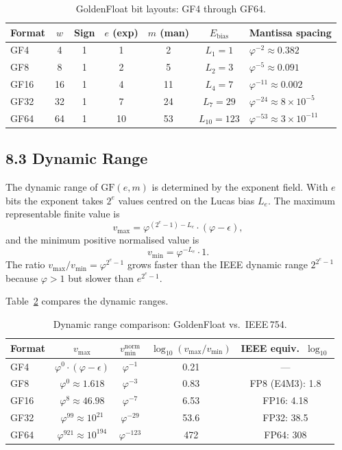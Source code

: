 \begin{table}[h]
\centering
\caption{GoldenFloat bit layouts: GF4 through GF64.}
\label{fa_04:tab:bit-layouts}
\begin{tabular}{@{}lcccccl@{}}
\toprule
Format & \(w\) & Sign & \(e\) (exp) & \(m\) (man) & \(E_{\text{bias}}\) & Mantissa spacing \\
\midrule
GF4  & 4  & 1 & 1 & 2 & \(L_1 = 1\)    & \(\varphi^{-2} \approx 0.382\) \\
GF8  & 8  & 1 & 2 & 5 & \(L_2 = 3\)    & \(\varphi^{-5} \approx 0.091\) \\
GF16 & 16 & 1 & 4 & 11 & \(L_4 = 7\)   & \(\varphi^{-11} \approx 0.002\) \\
GF32 & 32 & 1 & 7 & 24 & \(L_7 = 29\)  & \(\varphi^{-24} \approx 8 \times 10^{-5}\) \\
GF64 & 64 & 1 & 10 & 53 & \(L_{10} = 123\) & \(\varphi^{-53} \approx 3 \times 10^{-11}\) \\
\bottomrule
\end{tabular}
\end{table}

\subsection{8.3 Dynamic Range}\label{fa_04:gf-dynamic-range}

The dynamic range of \(\mathrm{GF}(e,m)\) is determined by the exponent field.
With \(e\) bits the exponent takes \(2^{e}\) values centred on the Lucas bias
\(L_{e}\). The maximum representable finite value is
\[
  v_{\max} = \varphi^{(2^{e}-1) - L_{e}} \cdot (\varphi - \epsilon),
\]
and the minimum positive normalised value is
\[
  v_{\min} = \varphi^{-L_{e}} \cdot 1.
\]
The ratio \(v_{\max}/v_{\min} = \varphi^{2^{e}-1}\) grows faster than the
IEEE dynamic range \(2^{2^{e}-1}\) because \(\varphi > 1\) but slower than
\(e^{2^{e}-1}\).

Table~\ref{fa_04:tab:dynamic-range} compares the dynamic ranges.

\begin{table}[h]
\centering
\caption{Dynamic range comparison: GoldenFloat vs.\ IEEE\,754.}
\label{fa_04:tab:dynamic-range}
\begin{tabular}{@{}lcccc@{}}
\toprule
Format & \(v_{\max}\) & \(v_{\min}^{\text{norm}}\) & \(\log_{10}(v_{\max}/v_{\min})\) & IEEE equiv.\ \(\log_{10}\) \\
\midrule
GF4  & \(\varphi^{0} \cdot (\varphi - \epsilon)\) & \(\varphi^{-1}\) & 0.21 & --- \\
GF8  & \(\varphi^{0} \approx 1.618\) & \(\varphi^{-3}\) & 0.83 & FP8 (E4M3): 1.8 \\
GF16 & \(\varphi^{8} \approx 46.98\) & \(\varphi^{-7}\) & 6.53 & FP16: 4.18 \\
GF32 & \(\varphi^{99} \approx 10^{21}\) & \(\varphi^{-29}\) & 53.6 & FP32: 38.5 \\
GF64 & \(\varphi^{921} \approx 10^{194}\) & \(\varphi^{-123}\) & 472 & FP64: 308 \\
\bottomrule
\end{tabular}
\end{table}

